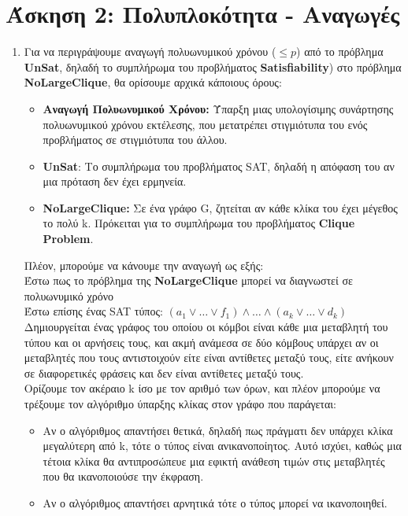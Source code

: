 \documentclass{article}
\begin{document}
\section*{\large Άσκηση 2: Πολυπλοκότητα - Αναγωγές}
\begin{enumerate}[label=(\alph*)]
\item Για να περιγράψουμε αναγωγή πολυωνυμικού χρόνου ($\leq p$) από το πρόβλημα \textbf{UnSat}, δηλαδή το συμπλήρωμα του προβλήματος \textbf{Satisfiability}) στο πρόβλημα \textbf{NoLargeClique}, θα ορίσουμε αρχικά κάποιους όρους:
\\
\begin{itemize}
\item \textbf{Αναγωγή Πολυωνυμικού Χρόνου:} Ύπαρξη μιας υπολογίσιμης συνάρτησης πολυωνυμικού χρόνου εκτέλεσης, που μετατρέπει στιγμιότυπα του ενός προβλήματος σε στιγμιότυπα του άλλου. 
\item \textbf{UnSat}: Το συμπλήρωμα του προβλήματος SAT, δηλαδή η απόφαση του αν μια πρόταση δεν έχει ερμηνεία. 
\item \textbf{NoLargeClique:} Σε ένα γράφο G, ζητείται αν κάθε κλίκα του έχει μέγεθος το πολύ k. Πρόκειται για το συμπλήρωμα του προβλήματος \textbf{Clique Problem}.
\end{itemize}
Πλέον, μπορούμε να κάνουμε την αναγωγή ως εξής: \\
Έστω πως το πρόβλημα της \textbf{NoLargeClique} μπορεί να διαγνωστεί σε πολυωνυμικό χρόνο \\
Έστω επίσης ένας  SAT τύπος:
$(a_1 \lor \ldots \lor f_1) \land \ldots \land (a_k \lor \ldots \lor d_k)$
\\
Δημιουργείται ένας γράφος του οποίου οι κόμβοι είναι κάθε μια μεταβλητή του τύπου και οι αρνήσεις τους, και ακμή ανάμεσα σε δύο κόμβους υπάρχει αν
οι μεταβλητές που τους αντιστοιχούν είτε είναι αντίθετες μεταξύ τους, είτε ανήκουν σε διαφορετικές φράσεις και δεν είναι αντίθετες μεταξύ τους.
\\
Ορίζουμε τον ακέραιο k ίσο με τον αριθμό των όρων, και πλέον μπορούμε να τρέξουμε τον αλγόριθμο ύπαρξης κλίκας στον γράφο που παράγεται:
\begin{itemize}
\item Αν ο αλγόριθμος απαντήσει θετικά, δηλαδή πως πράγματι δεν υπάρχει κλίκα μεγαλύτερη από k, τότε ο τύπος είναι ανικανοποίητος. Αυτό ισχύει, καθώς μια τέτοια κλίκα θα αντιπροσώπευε μια εφικτή ανάθεση τιμών στις μεταβλητές που θα ικανοποιούσε την έκφραση.
\item Αν ο αλγόριθμος απαντήσει αρνητικά τότε ο τύπος μπορεί να ικανοποιηθεί. 

\end{itemize}
\end{enumerate}
\end{document}
